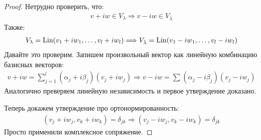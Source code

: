 \begin{proof} \quad 
    
Нетрудно проверить, что:
\begin{gather*}
    v + iw \in V_{\lambda} \Longrightarrow v - iw \in V_{\bar{\lambda}}
\end{gather*}
Также:
\begin{gather*}
    V_{\lambda} = \operatorname{Lin}(v_1 + iw_1, \dots, v_l + iw_l) \Longrightarrow V_{\bar{\lambda}} = \operatorname{Lin}(v_1 - iw_1, \dots, v_l - iw_l)
\end{gather*}
Давайте это проверим. Запишем произвольный вектор как линейную комбинацию базисных векторов: 
\begin{gather*}
    v + iw = \sum_{j = 1}^{l} (\alpha_j + i \beta_j) (v_j + i w_j) \Longrightarrow v - iw = \sum_{}^{} (\alpha_j - i \beta_j) (v_j - i w_j)
\end{gather*}
Аналогично преверяем линейную независимость и первое утверждение доказано. 

Теперь докажем утверждение про ортонормированность:
\begin{gather*}
    (v_j + i w_j, v_k + iw_k) = \delta_{jk} \Longrightarrow  (v_j - i w_j, v_k - iw_k) = \delta_{jk}
\end{gather*}
Просто применили комплексное сопряжение.
\end{proof}

